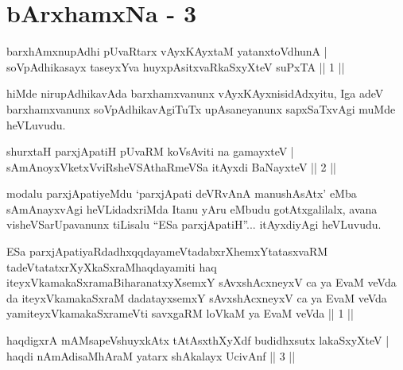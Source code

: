 
\chapter{bArxhamxNa - 3}
 \begin{shl}
barxhAmxnupAdhi pUvaRtarx vAyxKAyxtaM yatanxtoV\s dhunA | \\
soVpAdhikasayx taseyxYva huyxpAsitxvaRkaSxyXteV suPxTA \hfill ||  1 || 
\end{shl}

\begin{artha}
hiMde nirupAdhikavAda barxhamxvanunx vAyxKAyxnisidAdxyitu, Iga adeV barxhamxvanunx soVpAdhikavAgiTuTx upAsaneyanunx sapxSaTxvAgi muMde heVLuvudu.
\end{artha}

\begin{shl}
shurxtaH parxjApatiH pUvaRM koV\s sAviti na gamayxteV | \\
sAmAnoyxVketxVviRsheVSAthaRmeVSa itAyxdi BaNayxteV \hfill ||  2 || 
\end{shl}	

\begin{artha}
modalu parxjApatiyeMdu `parxjApati deVRvAnA manushAsAtx' eMba sAmAnayxvAgi heVLidadxriMda Itanu yAru eMbudu gotAtxgalilalx, avana visheVSarUpavanunx tiLisalu ``ESa parxjApatiH''... itAyxdiyAgi heVLuvudu.
\end{artha}

\begin{kandikeshl}
ESa parxjApatiyaRdadhxqqdayameVtadabxrXhemxYtatasxvaRM tadeVtatatxrXyXkaSxraM\break haqdayamiti haq iteyxVkamakaSxramaBiharanatxyXsemxY sAvxshAcxneyxV ca ya EvaM veVda da iteyxVkamakaSxraM dadatayxsemxY sAvxshAcxneyxV ca ya EvaM veVda yamiteyxVkamakaSxrameVti savxgaRM loVkaM ya EvaM veVda || 1 ||
\end{kandikeshl}


\begin{shl}
haqdigxrA mAMsapeVshuyxkAtx tAtAsxthXyXdf budidhxsutx lakaSxyXteV | \\
haqdi nAmAdisaMhAraM yatarx shAkalayx UcivAnf \hfill ||  3 || 
\end{shl}

